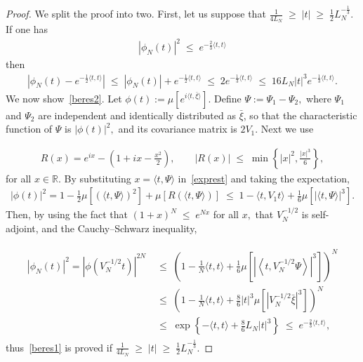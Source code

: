 \documentclass[10pt,a4paper]{article}
\renewcommand{\leq}{\;\leqslant\;}
\renewcommand{\geq}{\;\geqslant\;}
\newcommand{\scalar}[2]{\langle #1, #2\rangle}
\newcommand{\bbR}{\mathbb{R}}
\begin{document}
\begin{proof}
We split the proof into two. First, let us suppose that $ \frac{1}{4L_N}\geq|t|\geq\frac{1}{2}L_N^{-\frac{1}{3}}.$ If one has
\begin{align}\label{beres2}
|\phi_N(t)|^2\leq e^{-\frac{2}{3}\scalar{t}{t}}
\end{align}
then
\begin{align}
\left|\phi_N(t)-e^{-\frac12\scalar{t}{t}}\right|\leq|\phi_N(t)|+e^{-\frac12\scalar{t}{t}}\leq 2e^{-\frac13\scalar{t}{t}}\leq16L_N|t|^3e^{-\frac13\scalar{t}{t}}.
\end{align}
We now show~\eqref{beres2}. Let $\phi(t) := \mu\left[e^{i\scalar t{\bar{\xi}}}\right].$ Define $\Psi:=\Psi_1 - \Psi_2,$ where $\Psi_1$ and $\Psi_2$ are independent and identically distributed as $\bar{\xi}$, so that the characteristic function of $\Psi$ is $|\phi(t)|^2,$ and its covariance matrix is $2V_1.$ Next we use

\begin{align}\label{exprest}
R(x)=e^{ix}-\left(1+ix-\frac{x^2}{2}\right),\qquad |R(x)|\leq \min\left\{|x|^2,\frac{|x|^3}{6}\right\},
\end{align}
for all $x \in \bbR.$ By substituting $x=\scalar{t}{\Psi}$ in~\eqref{exprest} and taking the expectation,
\begin{multline}\label{charfunc1}
|\phi(t)|^2 = 1-\frac{1}{2}\mu\left[\left(\scalar{t}{\Psi}\right)^2\right] + \mu\left[R\left(\scalar{t}{\Psi}\right)\right]
\leq 1-\scalar{t}{V_1t} + \frac{1}{6}\mu\left[\left|\scalar{t}{\Psi}\right|^3\right].
\end{multline}
Then, by using the fact that $(1+x)^N\leq e^{Nx}$ for all $x,$ that $V_N^{-1/2}$ is self-adjoint, and the Cauchy--Schwarz inequality,

\begin{align}
\begin{split}
|\phi_N(t)|^2 =\left|\phi\left(V_N^{-1/2}t\right)\right|^{2N}
&\leq\left(1-\frac1N \scalar{t}{t} + \frac16 \mu\left[\left|\left\langle t,V_N^{-1/2}\Psi\right\rangle\right|^3\right]\right)^N\\
&\leq \left(1-\frac1N \scalar{t}{t} + \frac{8}{6}|t|^3\mu\left[\left|V_N^{-1/2}\bar{\xi}\right|^3\right]\right)^N\\
&\leq \exp\left\{-\scalar{t}{t}+\frac{8}{6}L_N|t|^3\right\} \leq e^{-\frac{2}{3}\scalar{t}{t}},
\end{split}
\end{align}
thus~\eqref{beres1} is proved if $ \frac{1}{4L_N}\geq|t|\geq\frac{1}{2}L_N^{-\frac{1}{3}}.$


\end{proof}
\end{document}

